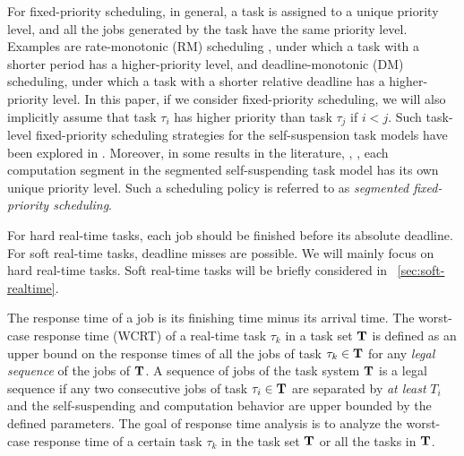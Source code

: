 For fixed-priority scheduling, in general, a task is assigned to a
unique priority level, and all the jobs generated by the task have the
same priority level. Examples are rate-monotonic (RM) scheduling
\cite{Liu_1973}, under which a task with a shorter period has a
higher-priority level, and deadline-monotonic (DM) scheduling, under which
a task with a shorter relative deadline has a higher-priority level.
In this paper, if we consider fixed-priority scheduling, we will also implicitly assume that task $\tau_i$ has higher priority than task $\tau_j$ if $i < j$.
Such task-level fixed-priority scheduling strategies for the self-suspension task models have been explored in
\cite{Raj:suspension1991,RTCSA-KimCPKH95,MingLiRTCSA1994,PH:rtss98,ECRTS-AudsleyB04,RTAS-AudsleyB04,RTCSA-BletsasA05,LR:rtas10,RTSS-KimANR13,LiuChen:rtss2014,huangpass:dac2015,Huang:multiseg,WC16-suspend-DATE,ChenECRTS2016-suspension}.
Moreover, in some results in the literature, \eg,
\cite{RTSS-KimANR13,DBLP:journals/ieicet/DingTT09}, each computation
segment in the segmented self-suspending task model has its own unique
priority level. Such a scheduling
policy is referred to as \emph{segmented fixed-priority scheduling}.

For hard real-time tasks, each job should be finished before its
absolute deadline. For soft real-time tasks, deadline misses are
possible. We will mainly focus on hard real-time tasks. 
Soft real-time tasks will be briefly considered in
\mysectionref{}~\ref{sec:soft-realtime}.

The response time of a job is its finishing time minus its arrival
time.  The worst-case response time (WCRT) of a real-time task
$\tau_k$ in a task set ${\bf T}$ is defined as an upper bound on the
response times of all the jobs of task $\tau_k \in {\bf T}$ for any
\emph{legal sequence} of the jobs of ${\bf T}$. A sequence of jobs of
the task system ${\bf T}$ is a legal sequence if any two consecutive
jobs of task $\tau_i \in {\bf T}$ are separated by \emph{at least}
$T_i$ and the self-suspending and computation behavior are upper
bounded by the defined parameters. The goal of response time analysis is to
analyze the worst-case response time of a certain task $\tau_k$ in the
task set ${\bf T}$ or all the tasks in ${\bf T}$.

